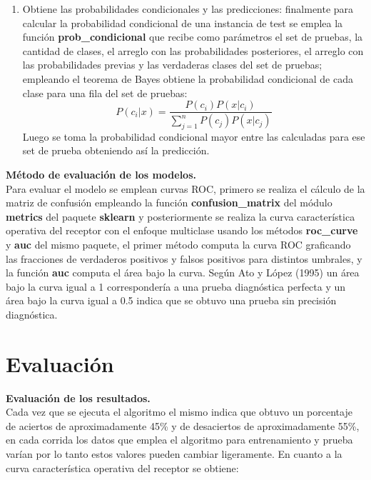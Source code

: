 \begin{enumerate}
	\item Obtiene las probabilidades condicionales y las predicciones:
	finalmente para calcular la probabilidad condicional de una instancia de test se emplea la función
	\textbf{prob\_condicional} que recibe como parámetros el set de pruebas, la cantidad de clases, el
	arreglo con las probabilidades posteriores, el arreglo con las probabilidades previas y las verdaderas
	clases del set de pruebas; empleando el teorema de Bayes obtiene la probabilidad condicional de cada
	clase para una fila del set de pruebas:
	\[P\left(c_{i}|x\right)=
	\frac{P\left(c_{i}\right)P\left(x|c_{i}\right)}{\sum_{j=1}^{n}P\left(c_{j}\right)P\left(x|c_{j}\right)}
	\]
	Luego se toma la probabilidad condicional mayor entre las calculadas para ese set de prueba
	obteniendo así la predicción.
\end{enumerate}

\noindent
\textbf{Método de evaluación de los modelos.}\\

Para evaluar el modelo se emplean curvas ROC, primero se realiza el cálculo de la matriz de confusión empleando la función
\textbf{confusion\_matrix} del módulo \textbf{metrics} del paquete \textbf{sklearn}
y posteriormente se realiza la curva característica operativa del receptor con el enfoque multiclase usando los métodos
\textbf{roc\_curve} y \textbf{auc} del mismo paquete, el primer método computa la curva ROC graficando las fracciones de
verdaderos positivos y falsos positivos para distintos umbrales, y la función \textbf{auc} computa el área bajo la curva.
Según Ato y López (1995) un área bajo la curva igual a 1 correspondería a una prueba diagnóstica perfecta y un
área bajo la curva igual a 0.5 indica que se obtuvo una prueba sin precisión diagnóstica.

\section{Evaluación}

\noindent
\textbf{Evaluación de los resultados.}\\

Cada vez que se ejecuta el algoritmo el mismo indica que obtuvo un porcentaje de aciertos de aproximadamente
45\% y de desaciertos de aproximadamente 55\%, en cada corrida los datos que emplea el algoritmo para entrenamiento
y prueba varían por lo tanto estos valores pueden cambiar ligeramente. En cuanto a la curva característica
operativa del receptor se obtiene:

